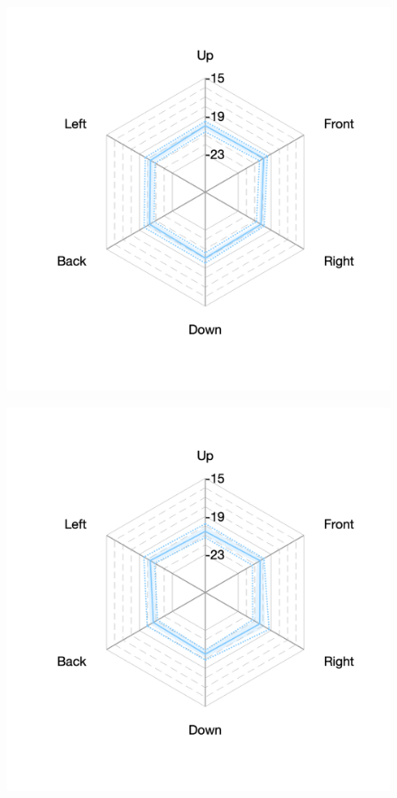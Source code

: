 \documentclass[11pt,a4j]{jreport}
\begin{document}
\begin{figure}[H]
  \begin{minipage}[b]{.33\textwidth}
    \centering
    \includegraphics[width=1\linewidth]{images/realHallDirSt/late_hall_d_allpoints.png}
    \label{fig:ホールDにおけるSTlate}
  \end{minipage}%
  \begin{minipage}[b]{.33\textwidth}
    \centering
    \includegraphics[width=1\linewidth]{images/realHallDirSt/late_hall_e_allpoints.png}

\end{minipage}
\end{figure}
\end{document}

